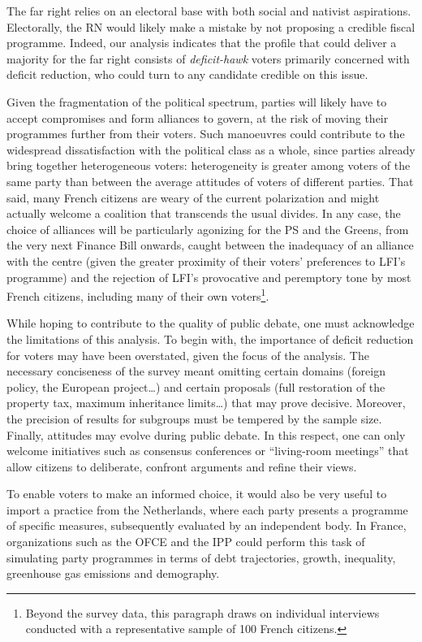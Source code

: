 \documentclass[12pt,english]{article}
\newcommand{\blue}[1]{\textcolor{blue!60!black}{#1}}
\begin{document}
The far right relies on an electoral base with both social and nativist aspirations. Electorally, \blue{the RN would likely make a mistake by not proposing a credible fiscal programme. Indeed, our analysis indicates that the profile that could deliver a majority for the far right consists of \textit{deficit-hawk} voters primarily concerned with deficit reduction}, who could turn to any candidate credible on this issue.

Given the fragmentation of the political spectrum, parties will likely have to accept compromises and form alliances to govern, at the risk of moving their programmes further from their voters. Such manoeuvres could contribute to the \blue{widespread dissatisfaction with the political class as a whole}, since parties already bring together heterogeneous voters: \blue{heterogeneity is greater among voters of the same party than between the average attitudes of voters of different parties.}
That said, many French citizens are weary of the current polarization and might actually welcome a coalition that transcends the usual divides.
In any case, the choice of alliances will be particularly agonizing for the PS and the Greens, from the very next Finance Bill onwards, caught between the inadequacy of an alliance with the centre (given the greater proximity of their voters' preferences to LFI's programme) and the rejection of LFI's provocative and peremptory tone by most French citizens, including many of their own voters\footnote{Beyond the survey data, this paragraph draws on individual interviews conducted with a representative sample of 100 French citizens.}.

While hoping to contribute to the quality of public debate, one must acknowledge the limitations of this analysis. To begin with, the importance of deficit reduction for voters may have been overstated, given the focus of the analysis. The necessary conciseness of the survey meant omitting certain domains (foreign policy, the European project\dots{}) and certain proposals (full restoration of the property tax, maximum inheritance limits\dots{}) that may prove decisive. Moreover, the precision of results for subgroups must be tempered by the sample size. Finally, attitudes may evolve during public debate. In this respect, one can only welcome initiatives such as consensus conferences or ``living-room meetings'' that allow citizens to deliberate, confront arguments and refine their views.

To enable voters to make an informed choice, it would also be very useful to import a practice from the Netherlands, where each party presents a programme of specific measures, subsequently evaluated by an independent body. In France, organizations such as the OFCE and the IPP could perform this task of simulating party programmes in terms of debt trajectories, growth, inequality, greenhouse gas emissions and demography.
\end{document}
